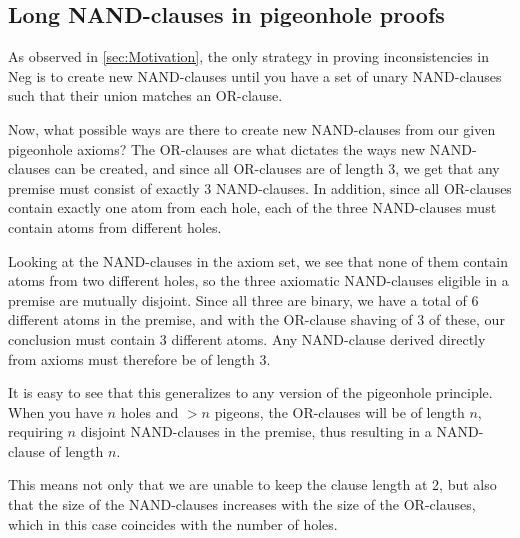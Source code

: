 \subsection{Long NAND-clauses in pigeonhole proofs}
\label{sub:Long NAND-clauses in pigeonhole proofs}
As observed in \ref{sec:Motivation}, the only strategy in proving inconsistencies in Neg is to create new NAND-clauses until you have a set of unary NAND-clauses such that their union matches an OR-clause.

Now, what possible ways are there to create new NAND-clauses from our given pigeonhole axioms?
The OR-clauses are what dictates the ways new NAND-clauses can be created, and since all OR-clauses are of length 3, we get that any premise must consist of exactly 3 NAND-clauses.
In addition, since all OR-clauses contain exactly one atom from each hole, each of the three NAND-clauses must contain atoms from different holes.

Looking at the NAND-clauses in the axiom set, we see that none of them contain atoms from two different holes, so the three axiomatic NAND-clauses eligible in a premise are mutually disjoint.
Since all three are binary, we have a total of 6 different atoms in the premise, and with the OR-clause shaving of 3 of these, our conclusion must contain 3 different atoms.
Any NAND-clause derived directly from axioms must therefore be of length 3.
\begin{prooftree*}
\end{prooftree*}

It is easy to see that this generalizes to any version of the pigeonhole principle.
When you have $n$ holes and $>n$ pigeons, the OR-clauses will be of length $n$, requiring $n$ disjoint NAND-clauses in the premise, thus resulting in a NAND-clause of length $n$.

This means not only that we are unable to keep the clause length at 2, but also that the size of the NAND-clauses increases with the size of the OR-clauses, which in this case coincides with the number of holes.
